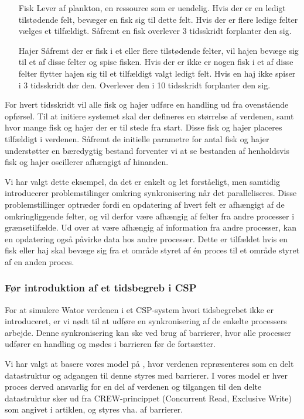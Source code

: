 \begin{itemize}
\item[Fisk]
Lever af plankton, en ressource som er uendelig. Hvis der er en ledigt 
tilstødende felt, bevæger en fisk sig til dette felt. Hvis der er flere ledige 
felter vælges et tilfældigt. Såfremt en fisk overlever 3 tidsskridt forplanter 
den sig.
\item[Hajer]
Såfremt der er fisk i et eller flere tilstødende felter, vil hajen bevæge sig 
til et af disse felter og spise fisken. Hvis der er ikke er nogen fisk i et af 
disse felter flytter hajen sig til et tilfældigt valgt ledigt felt. Hvis en haj 
ikke spiser i 3 tidsskridt dør den. Overlever den i 10 tidsskridt forplanter 
den sig.
\end{itemize}

For hvert tidsskridt vil alle fisk og hajer udføre en handling ud fra
ovenstående opførsel.
Til at initiere systemet skal der defineres en størrelse af verdenen,
samt hvor mange fisk og hajer der er til stede fra start. Disse fisk og
hajer placeres tilfældigt i verdenen.
Såfremt de initielle parametre for antal fisk og hajer understøtter en 
bæredygtig bestand forventer vi at se bestanden af henholdsvis fisk og hajer 
oscillerer afhængigt af hinanden.

Vi har valgt dette eksempel, da det er enkelt og let forståeligt, men samtidig 
introducerer problemstilinger omkring synkronisering når det paralleliseres.  
Disse problemstillinger optræder fordi en opdatering af hvert felt er afhængigt 
af de omkringliggende felter, og vil derfor være afhængig af felter fra andre 
processer i grænsetilfælde. Ud over at være afhængig af information fra andre 
processer, kan en opdatering også påvirke data hos andre processer. Dette er 
tilfældet hvis en fisk eller haj skal bevæge sig fra et område styret af én 
proces til et område styret af en anden proces.  

\subsubsection*{Før introduktion af et tidsbegreb i CSP} For at simulere Wator 
verdenen i et CSP-system hvori tidsbegrebet ikke er introduceret, er vi nødt 
til at udføre en synkronisering af de enkelte processers arbejde. Denne 
synkronisering kan ske ved brug af barrierer, hvor alle processer udfører en 
handling og mødes i barrieren før de fortsætter.

Vi har valgt at basere vores model på \cite{crew}, hvor verdenen repræsenteres 
som en delt datastruktur og adgangen til denne styres med barrierer. I vores 
model er hver proces derved ansvarlig for en del af verdenen og tilgangen til 
den delte datastruktur sker ud fra CREW-princippet (Concurrent Read, Exclusive 
Write) som angivet i artiklen, og styres vha. af barrierer. 

